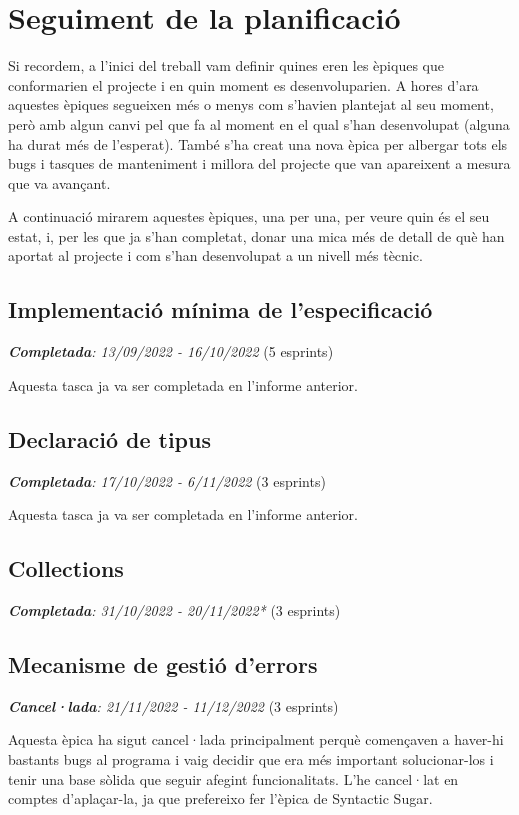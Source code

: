 ﻿\documentclass{article}
\begin{document}
\section{Seguiment de la planificació}

Si recordem, a l'inici del treball vam definir quines eren les èpiques que
conformarien el projecte i en quin moment es desenvoluparien. A hores d'ara
aquestes èpiques segueixen més o menys com s'havien plantejat al seu moment,
però amb algun canvi pel que fa al moment en el qual s'han desenvolupat (alguna
ha durat més de l'esperat). També s'ha creat una nova èpica per albergar tots
els bugs i tasques de manteniment i millora del projecte que van apareixent a
mesura que va avançant. 

A continuació mirarem aquestes èpiques, una per una, per veure quin és el seu
estat, i, per les que ja s'han completat, donar una mica més de detall de què
han aportat al projecte i com s'han desenvolupat a un nivell més tècnic.

\subsection{Implementació mínima de l'especificació}
\textit{\textbf{Completada}: 13/09/2022 - 16/10/2022} (5 esprints)

Aquesta tasca ja va ser completada en l'informe anterior.

\subsection{Declaració de tipus}
\textit{\textbf{Completada}: 17/10/2022 - 6/11/2022} (3 esprints)

Aquesta tasca ja va ser completada en l'informe anterior.

\subsection{Collections}
\textit{\textbf{Completada}: 31/10/2022 - 20/11/2022*} (3 esprints)

\subsection{Mecanisme de gestió d'errors}
\textit{\textbf{Cancel·lada}: 21/11/2022 - 11/12/2022} (3 esprints)

Aquesta èpica ha sigut cancel·lada principalment perquè començaven a haver-hi 
bastants bugs al programa i vaig decidir que era més important solucionar-los
i tenir una base sòlida que seguir afegint funcionalitats. L'he cancel·lat en 
comptes d'aplaçar-la, ja que prefereixo fer l'èpica de Syntactic Sugar.
\end{document}
